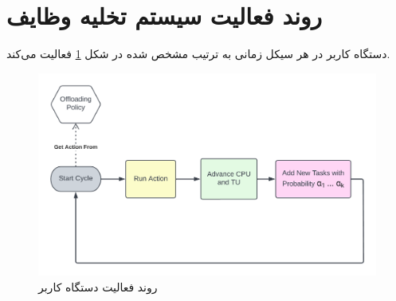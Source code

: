 \section{روند فعالیت سیستم تخلیه وظایف}
دستگاه کاربر در هر سیکل زمانی به ترتیب مشخص شده در شکل \ref{fig:ueproc} فعالیت می‌کند.
\begin{figure}[H]
	\centering
	\includegraphics[width=\textwidth]{figures/ueproc.png}
	\caption{روند فعالیت دستگاه کاربر}
	\label{fig:ueproc}
\end{figure}
